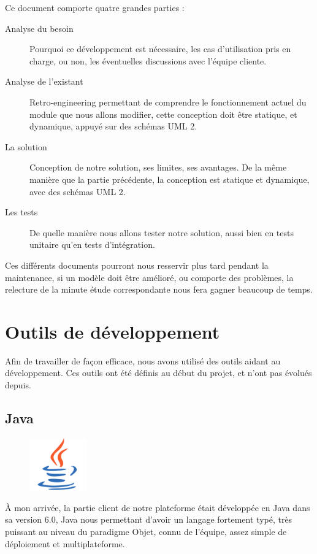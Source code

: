 Ce document comporte quatre grandes parties : 
\begin{description}
	\item[Analyse du besoin] Pourquoi ce développement est nécessaire, les cas d'utilisation pris en charge, ou non, les éventuelles discussions avec l'équipe cliente.
	\item[Analyse de l'existant] Retro-engineering permettant de comprendre le fonctionnement actuel du module que nous allons modifier, cette conception doit être statique, et dynamique, appuyé sur des schémas UML 2.
	\item[La solution] Conception de notre solution, ses limites, ses avantages. De la même manière que la partie précédente, la conception est statique et dynamique, avec des schémas UML 2.
	\item[Les tests] De quelle manière nous allons tester notre solution, aussi bien en tests unitaire qu'en tests d'intégration.
\end{description}

Ces différents documents pourront nous resservir plus tard pendant la maintenance, si un modèle doit être amélioré, ou comporte des problèmes, la relecture de la minute étude correspondante nous fera gagner beaucoup de temps.

\section{Outils de développement}
Afin de travailler de façon efficace, nous avons utilisé des outils aidant au développement. Ces outils ont été définis au début du projet, et n'ont pas évolués depuis.

\subsection{Java}
\begin{figure}
	\includegraphics[width=2.5cm]{contents/images/logoJava.png}
\end{figure}
À mon arrivée, la partie client de notre plateforme était développée en Java dans sa version 6.0, Java nous permettant d'avoir un langage fortement typé, très puissant au niveau du paradigme Objet, connu de l'équipe, assez simple de déploiement et multiplateforme. 

